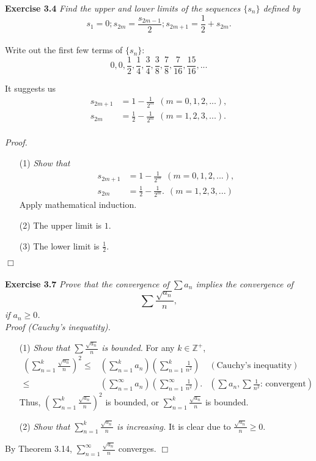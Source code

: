 \documentclass{article}
\begin{document}
\textbf{Exercise 3.4}
\emph{Find the upper and lower limits of the sequences $\{s_n\}$ defined by
$$s_1 = 0; s_{2m} = \frac{s_{2m-1}}{2}; s_{2m+1} = \frac{1}{2} + s_{2m}.$$ } \\

Write out the first few terms of $\{s_n\}$:
$$0, 0, \frac{1}{2}, \frac{1}{4}, \frac{3}{4},
\frac{3}{8}, \frac{7}{8}, \frac{7}{16}, \frac{15}{16}, ...$$

It suggests us
\begin{align*}
s_{2m+1} &= 1 - \frac{1}{2^m} \:\: (m = 0, 1, 2, ...), \\
s_{2m} &= \frac{1}{2} - \frac{1}{2^m} \:\: (m = 1, 2, 3, ...). \\
\end{align*}

\emph{Proof.}
\begin{enumerate}
\item[(1)]
\emph{Show that
\begin{align*}
s_{2m+1} &= 1 - \frac{1}{2^m} \:\: (m = 0, 1, 2, ...), \\
s_{2m} &= \frac{1}{2} - \frac{1}{2^m}. \:\: (m = 1, 2, 3, ...)
\end{align*}}
Apply mathematical induction.
\item[(2)]
The upper limit is $1$.
\item[(3)]
The lower limit is $\frac{1}{2}$.
\end{enumerate}

$\Box$ \\\\






\textbf{Exercise 3.7}
\emph{Prove that the convergence of $\sum a_n$ implies the convergence of
$$\sum \frac{\sqrt{a_n}}{n},$$
if $a_n \geq 0$.} \\

\emph{Proof (Cauchy's inequatity).}
\begin{enumerate}
\item[(1)]
\emph{Show that $\sum\frac{\sqrt{a_n}}{n}$ is bounded.}
For any $k \in \mathbb{Z}^{+}$,
\begin{align*}
\left( \sum_{n=1}^{k} \frac{\sqrt{a_n}}{n} \right)^2
\leq&
\left( \sum_{n=1}^{k}{a_n} \right)
\left( \sum_{n=1}^{k}{\frac{1}{n^2}} \right)
  &(\text{Cauchy's inequatity}) \\
\leq& \left( \sum^{\infty}_{n=1}{a_n} \right)
\left( \sum^{\infty}_{n=1}{\frac{1}{n^2}} \right).
  &\left(\text{$\sum{a_n}, \sum{\frac{1}{n^2}}$: convergent}\right)
\end{align*}
Thus,
$\left( \sum_{n=1}^{k}\frac{\sqrt{a_n}}{n} \right)^2$ is bounded,
or $\sum_{n=1}^{k}\frac{\sqrt{a_n}}{n}$ is bounded.
\item[(2)]
\emph{Show that $\sum_{n=1}^{k} \frac{\sqrt{a_n}}{n}$ is increasing.}
It is clear due to $\frac{\sqrt{a_n}}{n} \geq 0$.
\end{enumerate}
By Theorem 3.14, $\sum_{n=1}^{\infty} \frac{\sqrt{a_n}}{n}$ converges.
$\Box$ \\
\end{document}
